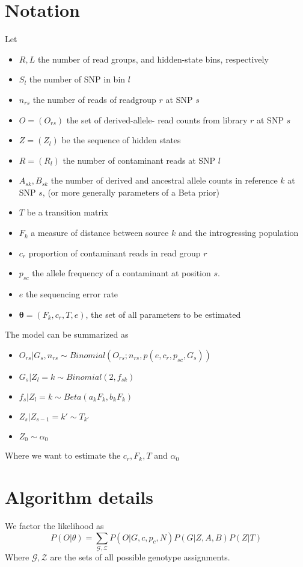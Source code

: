 \documentclass[10pt,a4paper]{article}
\begin{document}
\section*{Notation}
	Let 
	\begin{itemize}
		\item $R, L$ the number of read groups, and hidden-state bins, respectively
		\item $S_l$ the number of SNP in bin $l$
		\item $n_{rs}$ the number of reads of readgroup $r$ at SNP $s$
		\item $O = (O_{rs})$ the set of derived-allele- read counts from library $r$ at SNP $s$
		\item $Z = (Z_l)$ be the sequence of hidden states
		\item $R = (R_{l})$ the number of contaminant reads at SNP $l$
		\item $A_{sk}, B_{sk}$ the number of derived and ancestral allele counts in reference $k$ at SNP $s$, (or more generally parameters of a Beta prior)
		\item $T$ be a transition matrix		
		\item $F_k$ a measure of distance between source $k$ and the introgressing population
		\item $c_r$ proportion of contaminant reads in read group $r$
		\item $p_{sc}$ the allele frequency of a contaminant at position $s$. 
		\item $e$ the sequencing error rate
		\item $\mathbf{\theta} = (F_k, c_r, T, e)$, the set of all parameters to be estimated
	\end{itemize}
The model can be summarized as
	\begin{itemize}
		\item $O_{rs} | G_{s}, n_{rs} \sim Binomial(O_{rs}; n_{rs}, p(e, c_r, p_{sc}, G_{s}))$
		\item $G_s|Z_l=k \sim Binomial(2, f_{sk})$
		\item $f_{s} | Z_l=k \sim Beta(a_kF_k, b_kF_k)$
		\item $Z_s | Z_{s-1}= k' \sim T_{k'}$
		\item $Z_0 \sim \alpha_0$
	\end{itemize}
	Where we want to estimate the $c_r, F_k, T$ and $\alpha_0$

\section{Algorithm details}
We factor the likelihood as 
$$P(O | \theta) =  \sum_{\mathcal{G}, \mathcal{Z}} P(O | G, c, p_c, N)P(G | Z, A, B) P(Z| T)$$
Where $\mathcal{G}, \mathcal{Z}$ are the sets of all possible genotype assignments.
\end{document}

